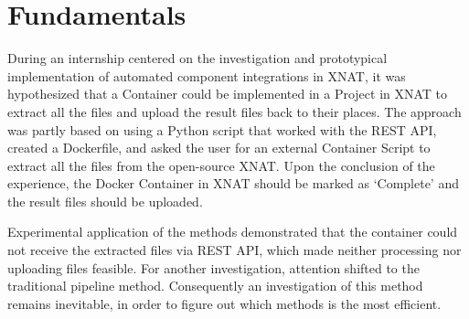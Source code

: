 


\section{Fundamentals}

During an internship centered on the investigation and prototypical implementation of automated component integrations in XNAT, it was hypothesized that a Container could be implemented in a Project in XNAT to extract all the files and upload the result files back to their places. The approach was partly based on using a Python script that worked with the REST API, created a Dockerfile, and asked the user for an external Container Script to extract all the files from the open-source XNAT. Upon the conclusion of the experience, the Docker Container in XNAT should be marked as ‘Complete’ and the result files should be uploaded. 

Experimental application of the methods demonstrated that the container could not receive the extracted files via REST API, which made neither processing nor uploading files feasible. For another investigation, attention shifted to the traditional pipeline method. Consequently an investigation of this method remains inevitable, in order to figure out which methods is the most efficient.

  






